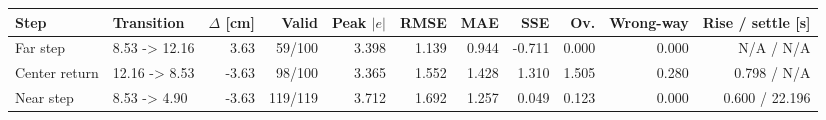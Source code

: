 \scriptsize
\setlength{\tabcolsep}{4pt}
\begin{tabularx}{\linewidth}{@{}l l r r r r r r r r r@{}}
\toprule
Step & Transition & $\Delta$ [cm] & Valid & Peak $|e|$ & RMSE & MAE & SSE & Ov. & Wrong-way & Rise / settle [s] \\
\midrule
Far step & 8.53 -> 12.16 & 3.63 & 59/100 & 3.398 & 1.139 & 0.944 & -0.711 & 0.000 & 0.000 & N/A / N/A \\
Center return & 12.16 -> 8.53 & -3.63 & 98/100 & 3.365 & 1.552 & 1.428 & 1.310 & 1.505 & 0.280 & 0.798 / N/A \\
Near step & 8.53 -> 4.90 & -3.63 & 119/119 & 3.712 & 1.692 & 1.257 & 0.049 & 0.123 & 0.000 & 0.600 / 22.196 \\
\bottomrule
\end{tabularx}
